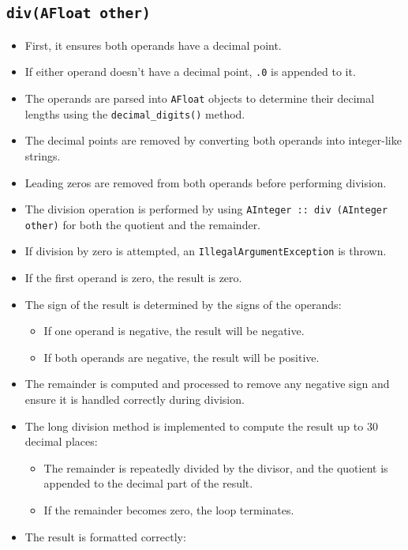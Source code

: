 \documentclass{article}
\begin{document}
\subsection*{\texttt{div(AFloat other)}}
\begin{itemize}
    \item First, it ensures both operands have a decimal point.
    \item If either operand doesn't have a decimal point, \texttt{.0} is appended to it.
    \item The operands are parsed into \texttt{AFloat} objects to determine their decimal lengths using the \texttt{decimal\_digits()} method.
    \item The decimal points are removed by converting both operands into integer-like strings.
    \item Leading zeros are removed from both operands before performing division.
    \item The division operation is performed by using \texttt{AInteger :: div (AInteger other)} for both the quotient and the remainder.
    \item If division by zero is attempted, an \texttt{IllegalArgumentException} is thrown.
    \item If the first operand is zero, the result is zero.
    \item The sign of the result is determined by the signs of the operands:
        \begin{itemize}
            \item If one operand is negative, the result will be negative.
            \item If both operands are negative, the result will be positive.
        \end{itemize}
    \item The remainder is computed and processed to remove any negative sign and ensure it is handled correctly during division.
    \item The long division method is implemented to compute the result up to 30 decimal places:
        \begin{itemize}
            \item The remainder is repeatedly divided by the divisor, and the quotient is appended to the decimal part of the result.
            \item If the remainder becomes zero, the loop terminates.
        \end{itemize}
    \item The result is formatted correctly:

\end{itemize}
\end{document}
